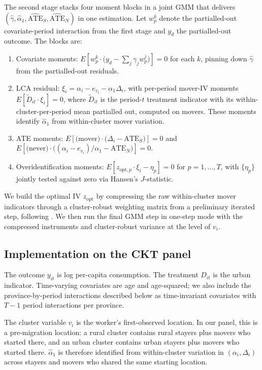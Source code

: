 The second stage stacks four moment blocks in a joint GMM that delivers $(\hat\gamma, \hat\alpha_1, \widehat{\text{ATE}}_S, \widehat{\text{ATE}}_N)$ in one estimation.
Let $w_p^k$ denote the partialled-out covariate-period interaction from the first stage and $y_d$ the partialled-out outcome.
The blocks are:
\begin{enumerate}[label=\textup{(\arabic*)},leftmargin=*,itemsep=2pt]
    \item Covariate moments: $E\!\left[w_p^k \cdot \big(y_d - \sum_j \gamma_j w_p^j\big)\right] = 0$ for each $k$, pinning down $\hat\gamma$ from the partialled-out residuals.
    \item LCA residual: $\xi_i = \alpha_i - e_{v_i} - \alpha_1 \Delta_i$, with per-period mover-IV moments $E\!\left[\tilde D_{it} \cdot \xi_i\right] = 0$, where $\tilde D_{it}$ is the period-$t$ treatment indicator with its within-cluster-per-period mean partialled out, computed on movers.
    These moments identify $\hat\alpha_1$ from within-cluster mover variation.
    \item ATE moments: $E\!\left[\text{(mover)} \cdot \big(\Delta_i - \mathrm{ATE}_S\big)\right] = 0$ and $E\!\left[\text{(never)} \cdot \big((\alpha_i - e_{v_i})/\alpha_1 - \mathrm{ATE}_N\big)\right] = 0$.
    \item Overidentification moments: $E\!\left[z_{\text{opt},p} \cdot \xi_i - \eta_p\right] = 0$ for $p = 1,\dots,T$, with $\{\eta_p\}$ jointly tested against zero via Hansen's $J$-statistic.
\end{enumerate}
We build the optimal IV $z_{\text{opt}}$ by compressing the raw within-cluster mover indicators through a cluster-robust weighting matrix from a preliminary iterated step, following \citet{verdierAverageTreatmentEffects2020a}.
We then run the final GMM step in one-step mode with the compressed instruments and cluster-robust variance at the level of $v_i$.

\subsection{Implementation on the CKT panel}\label{app:vv-rob-implementation}

The outcome $y_{it}$ is log per-capita consumption.
The treatment $D_{it}$ is the urban indicator.
Time-varying covariates are age and age-squared; we also include the province-by-period interactions described below as time-invariant covariates with $T-1$ period interactions per province.

The cluster variable $v_i$ is the worker's first-observed location.
In our panel, this is a pre-migration location: a rural cluster contains rural stayers plus movers who started there, and an urban cluster contains urban stayers plus movers who started there.
$\hat\alpha_1$ is therefore identified from within-cluster variation in $(\alpha_i, \Delta_i)$ across stayers and movers who shared the same starting location.


